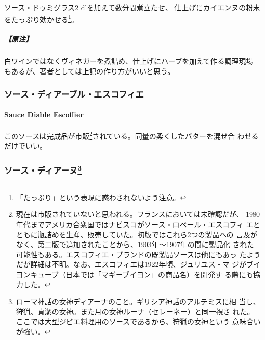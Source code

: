 \begin{recette}
\protect\hyperlink{sauce-demi-glace}{ソース・ドゥミグラス}2
dlを加えて数分間煮立たせ、
仕上げにカイエンヌの粉末をたっぷり効かせる\footnote{「たっぷり」という表現に惑わされないよう注意。}。

\hypertarget{ux539fux6ce8}{%
\subparagraph{【原注】}\label{ux539fux6ce8}}

白ワインではなくヴィネガーを煮詰め、仕上げにハーブを加えて作る調理現場
もあるが、著者としては上記の作り方がいいと思う。

\maeaki

\hypertarget{ux30bdux30fcux30b9ux30c7ux30a3ux30a2ux30fcux30d6ux30ebux30a8ux30b9ux30b3ux30d5ux30a3ux30a8}{%
\subsubsection{ソース・ディアーブル・エスコフィエ}\label{ux30bdux30fcux30b9ux30c7ux30a3ux30a2ux30fcux30d6ux30ebux30a8ux30b9ux30b3ux30d5ux30a3ux30a8}}

\hypertarget{sauce-diable-escoffier}{%
\paragraph{Sauce Diable Escoffier}\label{sauce-diable-escoffier}}

   

このソースは完成品が市販\footnote{現在は市販されていないと思われる。フランスにおいては未確認だが、
  1980年代までアメリカ合衆国ではナビスコがソース・ロベール・エスコフィ
  エとともに瓶詰めを生産、販売していた。初版ではこれら2つの製品への
  言及がなく、第二版で追加されたことから、1903年〜1907年の間に製品化
  された可能性もある。エスコフィエ・ブランドの既製品ソースは他にもあっ
  たようだが詳細は不明。なお、エスコフィエは1922年頃、ジュリユス・マ
  ジがブイヨンキューブ（日本では「マギーブイヨン」の商品名）を開発す
  る際にも協力した。}されている。同量の柔くしたバターを混ぜ合
わせるだけでいい。

\maeaki

\hypertarget{ux30bdux30fcux30b9ux30c7ux30a3ux30a2ux30fcux30cc28}{%
\subsubsection[ソース・ディアーヌ]{\texorpdfstring{ソース・ディアーヌ\footnote{ローマ神話の女神ディアーナのこと。ギリシア神話のアルテミスに相
  当し、狩猟、貞潔の女神。また月の女神ルーナ（セレーネー）と同一視さ
  れた。ここでは大型ジビエ料理用のソースであるから、狩猟の女神という
  意味合いが強い。}}{ソース・ディアーヌ}}\label{ux30bdux30fcux30b9ux30c7ux30a3ux30a2ux30fcux30cc28}}


\end{recette}
